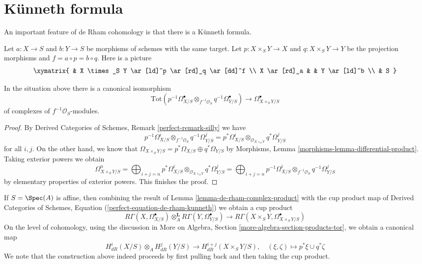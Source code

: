 \section{K\"unneth formula}
\label{section-kunneth}

\noindent
An important feature of de Rham cohomology is that there is a
K\"unneth formula.

\medskip\noindent
Let $a : X \to S$ and $b : Y \to S$ be morphisms of schemes with the same
target. Let $p : X \times_S Y \to X$ and $q : X \times_S Y \to Y$ be the
projection morphisms and $f = a \circ p = b \circ q$. Here is a picture
$$
\xymatrix{
& X \times_S Y \ar[ld]^p \ar[rd]_q \ar[dd]^f \\
X \ar[rd]_a & & Y \ar[ld]^b \\
& S
}
$$

\begin{lemma}
\label{lemma-de-rham-complex-product}
In the situation above there is a canonical isomorphism
$$
\text{Tot}(p^{-1}\Omega^\bullet_{X/S}
\otimes_{f^{-1}\mathcal{O}_S} q^{-1}\Omega^\bullet_{Y/S})
\longrightarrow
\Omega^\bullet_{X \times_S Y/S}
$$
of complexes of $f^{-1}\mathcal{O}_S$-modules.
\end{lemma}

\begin{proof}
By Derived Categories of Schemes, Remark \ref{perfect-remark-silly}
we have
$$
p^{-1}\Omega^i_{X/S} \otimes_{f^{-1}\mathcal{O}_S} q^{-1}\Omega^j_{Y/S} =
p^*\Omega^i_{X/S} \otimes_{\mathcal{O}_{X \times_S Y}} q^*\Omega^j_{Y/S}
$$
for all $i, j$. On the other hand, we know that
$
\Omega_{X \times_S Y/S} = p^*\Omega_{X/S} \oplus q^*\Omega_{Y/S}
$
by Morphisms, Lemma \ref{morphisms-lemma-differential-product}.
Taking exterior powers we obtain
$$
\Omega^n_{X \times_S Y/S} =
\bigoplus\nolimits_{i + j = n}
p^*\Omega^i_{X/S} \otimes_{\mathcal{O}_{X \times_S Y}} q^*\Omega^j_{Y/S} =
\bigoplus\nolimits_{i + j = n}
p^{-1}\Omega^i_{X/S} \otimes_{f^{-1}\mathcal{O}_S} q^{-1}\Omega^j_{Y/S}
$$
by elementary properties of exterior powers. This finishes the proof.
\end{proof}

\noindent
If $S = \Spec(A)$ is affine, then combining the result of
Lemma \ref{lemma-de-rham-complex-product} with the cup product map of
Derived Categories of Schemes, Equation (\ref{perfect-equation-de-rham-kunneth})
we obtain a cup product
$$
R\Gamma(X, \Omega^\bullet_{X/S})
\otimes_A^\mathbf{L}
R\Gamma(Y, \Omega^\bullet_{Y/S})
\longrightarrow
R\Gamma(X \times_S Y, \Omega^\bullet_{X \times_S Y/S})
$$
On the level of cohomology, using the discussion in
More on Algebra, Section \ref{more-algebra-section-products-tor},
we obtain a canonical map
$$
H^i_{dR}(X/S) \otimes_A H^j_{dR}(Y/S)
\longrightarrow
H^{i + j}_{dR}(X \times_S Y/S),\quad
(\xi, \zeta) \longmapsto p^*\xi \cup q^*\zeta
$$
We note that the construction above indeed proceeds by
first pulling back and then taking the cup product.


